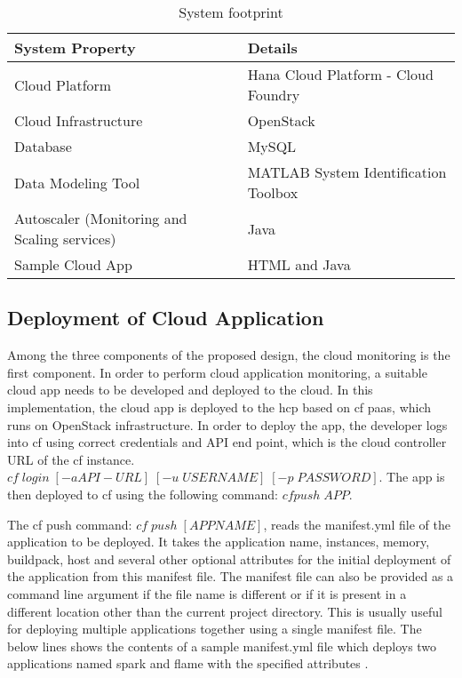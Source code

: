 \documentclass[article,type=msc,colorback,12pt,accentcolor=tud8b,table]{tudthesis}
\begin{document}
\begin{table}[H]
	\centering
	\label{tab:system_footprint}
	\begin{tabular}{|l|l|}
		\hline
		\rowcolor[HTML]{EC6500} 
		\textbf{System Property}  & \textbf{Details}                     \\ \hline
		Cloud Platform            & Hana Cloud Platform - Cloud Foundry  \\ \hline
		Cloud Infrastructure      & OpenStack                            \\ \hline
		Database                  & MySQL                                \\ \hline
		Data Modeling Tool        & MATLAB System Identification Toolbox \\ \hline
		Autoscaler (Monitoring and Scaling services) & Java                                 \\ \hline
		Sample Cloud App          & HTML and Java                        \\ \hline
	\end{tabular}
		\caption{System footprint}
\end{table}

 
	\subsection{Deployment of Cloud Application} 

	Among the three components of the proposed design, the cloud monitoring is the first component. In order to perform cloud application monitoring, a suitable cloud app needs to be developed and deployed to the cloud. In this implementation, the cloud app is deployed to the \gls{hcp} based on \gls{cf} \gls{paas}, which runs on OpenStack \cite{openstack} infrastructure. In order to deploy the app, the developer logs into \gls{cf} using correct credentials and API end point, which is the cloud controller URL of the \gls{cf} instance. $ cf \; login \; [-a API-URL] \; [-u \; USERNAME] \; [-p \; PASSWORD] $. The app is then deployed to \gls{cf} using the following command: $ cf push \; APP $.		

The \gls{cf} push command:  $ cf \; push \; [APPNAME] $, reads the manifest.yml file of the application to be deployed. It takes the application name, instances, memory, buildpack, host and several other optional attributes for the initial deployment of the application from this manifest file. The manifest file can also be provided as a command line argument if the file name is different or if it is present in a different location other than the current project directory. This is usually useful for deploying multiple applications together using a single manifest file. The below lines shows the contents of a sample manifest.yml file which deploys two applications named spark and flame with the specified attributes \cite{cf_manifest}. 
\end{document}
